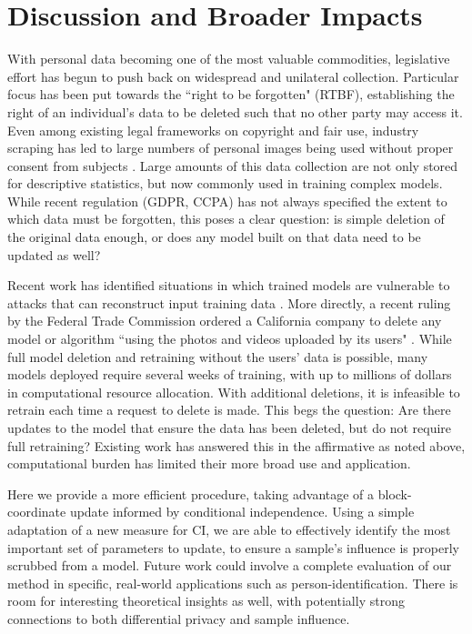 \section{Discussion and Broader Impacts}
With personal data becoming one of the most valuable commodities, legislative effort has begun to push back on widespread and unilateral collection.
Particular focus has been put towards the ``right to be forgotten" (RTBF), establishing the right of an individual's data to be deleted such that no other party may access it.
Even among existing legal frameworks on copyright and fair use, industry scraping has led to large numbers of personal images being used without proper consent from subjects \cite{Exposing}.
Large amounts of this data collection are not only stored for descriptive statistics, but now commonly used in training complex models.
While recent regulation (GDPR, CCPA) has not always specified the extent to which data must be forgotten, this poses a clear question: is simple deletion of the original data enough, or does any model built on that data need to be updated as well?

Recent work has identified situations in which trained models are vulnerable to attacks that can reconstruct input training data \cite{carlini2019secret,carlini2020attack}. More directly, a recent ruling by the Federal Trade Commission ordered a California company to delete any model or algorithm ``using the photos and videos uploaded by its users" \cite{ftc}.
While full model deletion and retraining without the users' data is possible, many models deployed require several weeks of training, with up to millions of dollars in computational resource allocation. With additional deletions, it is infeasible to retrain each time a request to delete is made. This begs the question: Are there updates to the model that ensure the data has been deleted, but do not require full retraining?
Existing work has answered this in the affirmative as noted above, computational burden has limited their more broad use and application.

Here we provide a more efficient procedure, taking advantage of a block-coordinate update informed by conditional independence. Using a simple adaptation of a new measure for CI, we are able to effectively identify the most important set of parameters to update, to ensure a sample's influence is properly scrubbed from a model.
Future work could involve a complete evaluation of our method in specific, real-world applications such as person-identification. There is room for interesting theoretical insights as well, with potentially strong connections to both differential privacy and sample influence.